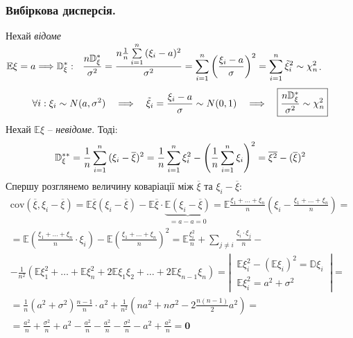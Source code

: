 \subsubsection{Вибіркова дисперсія.}
Нехай \textit{відоме} $\mathbb{E} \xi = a \Longrightarrow \displaystyle
\mathbb{D}_\xi^{*} : \ \
\frac{n \mathbb{D}_\xi^{*}}{\sigma^2} = \frac{n \frac{1}{n}  \sum\limits_{i = 1}^{n}{(\xi_i - a)^2}}{\sigma^2} =  \sum\limits_{i = 1}^{n}{ \left( \frac{\xi_i - a}{\sigma} \right)^2 } =  \sum\limits_{i = 1}^{n}{\tilde{\xi}^2_i} \sim \chi_n^2
$.
$$
\forall i : \xi_i \sim N(a, \sigma^2) \quad \Longrightarrow \quad \tilde{\xi}_i = \frac{\xi_i - a}{\sigma} \sim N(0, 1) \quad \Longrightarrow \quad \fbox{$\displaystyle \frac{n \mathbb{D}_\xi^{*}}{ \sigma^2} \sim \chi^2_n $}
$$
Нехай $\mathbb{E} \xi$ -- \textit{невідоме}. Тоді:
$$
\mathbb{D}_\xi^{**} = \frac{1}{n}  \sum\limits_{i = 1}^{n}{(\xi_i - \overline{\xi})^2} =
\frac{1}{n}  \sum\limits_{i = 1}^{n}{\xi_i^2}  -    \left( \frac{1}{n} \sum\limits_{i = 1}^{n}{\xi_i} \right)^2 = \overline{\xi^2} - (\overline{\xi})^2
$$
Спершу розглянемо величину коваріації між $\overline{\xi}$ та $\xi_i - \overline{\xi}$:
$$
\begin{gathered}
\mathrm{cov}(\overline{\xi}, \xi_i - \overline{\xi}) = \mathbb{E} \overline{\xi} \left( \xi_i - \overline{\xi} \right) - \mathbb{E} \overline{\xi} \cdot \underbrace{\mathbb{E}\left( \xi_i - \overline{\xi} \right)}_{= a-a = 0} =
\mathbb{E} \frac{\xi_1 + \dots + \xi_n}{n} \left( \xi_i - \frac{\xi_1 + \dots + \xi_n}{n} \right) =
\\
 = \mathbb{E} \left(  \frac{\xi_1 + \dots + \xi_n}{n} \cdot \xi_i  \right)- \mathbb{E} \left( \frac{\xi_1 + \dots + \xi_n}{n} \right)^2 = \mathbb{E} \frac{\xi_i^2}{n} +  \sum\limits_{j \neq i}^{}{ \frac{\xi_i \cdot \xi_j}{n} } -
\\
- \frac{1}{n^2} \left( \mathbb{E} \xi_1^2 + \dots + \mathbb{E}\xi_n^2 + 2 \mathbb{E}\xi_1 \xi_2 + \dots + 2 \mathbb{E} \xi_{n-1}\xi_n \right) = \left| \  \begin{gathered}
 \mathbb{E} \xi_i^2 - (\mathbb{E}\xi_i)^2 = \mathbb{D}\xi_i\\
 \mathbb{E} \xi_i^2 = a^2 + \sigma^2
\end{gathered} \  \right|  =
\\
=\frac{1}{n} (a^2 + \sigma^2)  \frac{n-1}{n} \cdot  a^2 + \frac{1}{n^2} (na^2 + n\sigma^2 - 2\frac{n(n-1)}{2}a^2 )=
\\
=
\frac{a^2}{n} + \frac{\sigma^2}{n} + a^2 -   \frac{a^2}{n} -   \frac{a^2}{n} - \frac{\sigma^2}{n}  -  a^2 +  \frac{a^2}{n} = \mathbf{0}
\end{gathered}
$$

